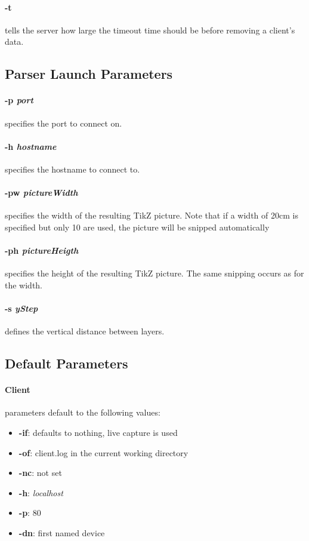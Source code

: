\paragraph{-t} tells the server how large the timeout time should be before removing a client's data.

\subsection*{Parser Launch Parameters}
\paragraph{-p \textit{port}} specifies the port to connect on.

\paragraph{-h \textit{hostname}} specifies the hostname to connect to.

\paragraph{-pw \textit{pictureWidth}} specifies the width of the resulting TikZ picture.
Note that if a width of 20cm is specified but only 10 are used, the picture will be snipped automatically

\paragraph{-ph \textit{pictureHeigth}} specifies the height of the resulting TikZ picture.
The same snipping occurs as for the width.

\paragraph{-s \textit{yStep}} defines the vertical distance between layers.

\subsection*{Default Parameters}
\paragraph{Client} parameters default to the following values:
\begin{itemize}
    \item \textbf{-if}: defaults to nothing, live capture is used
    \item \textbf{-of}: client.log in the current working directory
    \item \textbf{-nc}: not set
    \item \textbf{-h}: \textit{localhost}
    \item \textbf{-p}: 80
    \item \textbf{-dn}: first named device
\end{itemize}

